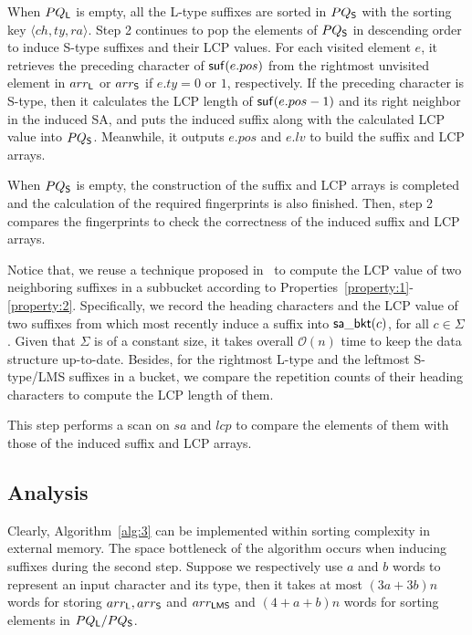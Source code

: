 \documentclass[10pt,journal,compsoc]{IEEEtran}
\begin{document}
	When $PQ_{\sf L}$ is empty, all the L-type suffixes are sorted in $PQ_{\sf S}$ with the sorting key $\langle ch, ty, ra\rangle$. Step 2 continues to pop the elements of $PQ_{\sf S}$ in descending order to induce S-type suffixes and their LCP values. For each visited element $e$, it retrieves the preceding character of ${\sf suf}(e.pos)$ from the rightmost unvisited element in $arr_{\sf L}$ or $arr_{\sf S}$ if $e.ty = 0$ or $1$, respectively. If the preceding character is S-type, then it calculates the LCP length of ${\sf suf}(e.pos - 1)$ and its right neighbor in the induced SA, and puts the induced suffix along with the calculated LCP value into $PQ_{\sf S}$. Meanwhile, it outputs $e.pos$ and $e.lv$ to build the suffix and LCP arrays.
	
	When $PQ_{\sf S}$ is empty, the construction of the suffix and LCP arrays is completed and the calculation of the required fingerprints is also finished. Then, step 2 compares the fingerprints to check the correctness of the induced suffix and LCP arrays.
	
	
	Notice that, we reuse a technique proposed in~\cite{Fischer11} to compute the LCP value of two neighboring suffixes in a subbucket according to Properties~\ref{property:1}-\ref{property:2}. Specifically, we record the heading characters and the LCP value of two suffixes from which most recently induce a suffix into ${\sf sa\_bkt}(c)$, for all $c \in \Sigma$. Given that $\Sigma$ is of a constant size, it takes overall $\mathcal{O}(n)$ time to keep the data structure up-to-date. Besides, for the rightmost L-type and the leftmost S-type/LMS suffixes in a bucket, we compare the repetition counts of their heading characters to compute the LCP length of them.
	
	
	\vspace{1ex}  This step performs a scan on $sa$ and $lcp$ to compare the elements of them with those of the induced suffix and LCP arrays.
	
	\subsection{Analysis}
	
	Clearly, Algorithm~\ref{alg:3} can be implemented within sorting complexity in external memory. The space bottleneck of the algorithm occurs when inducing suffixes  during the second step. Suppose we respectively use $a$ and $b$ words to represent an input character and its type, then it takes at most $(3a + 3b)n$ words for storing $arr_{\sf L}, arr_{\sf S}$ and $arr_{\sf LMS}$ and $(4 + a + b)n$ words for sorting elements in $PQ_{\sf L}/PQ_{\sf S}$.
	
\end{document}
